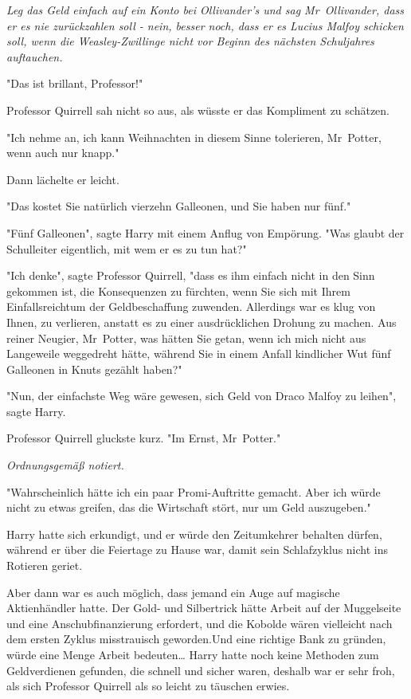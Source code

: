 {\emph{Leg das Geld einfach auf ein Konto bei Ollivander's und sag Mr~Ollivander, dass er es nie zurückzahlen soll - nein, besser noch, dass er es Lucius Malfoy schicken soll, wenn die Weasley-Zwillinge nicht vor Beginn des nächsten Schuljahres auftauchen.}

"Das ist brillant, Professor!"

Professor Quirrell sah nicht so aus, als wüsste er das Kompliment zu schätzen.

"Ich nehme an, ich kann Weihnachten in diesem Sinne tolerieren, Mr~Potter, wenn auch nur knapp."

Dann lächelte er leicht.

"Das kostet Sie natürlich vierzehn Galleonen, und Sie haben nur fünf."

"Fünf Galleonen", sagte Harry mit einem Anflug von Empörung. "Was glaubt der Schulleiter eigentlich, mit wem er es zu tun hat?"

"Ich denke", sagte Professor Quirrell, "dass es ihm einfach nicht in den Sinn gekommen ist, die Konsequenzen zu fürchten, wenn Sie sich mit Ihrem Einfallsreichtum der Geldbeschaffung zuwenden. Allerdings war es klug von Ihnen, zu verlieren, anstatt es zu einer ausdrücklichen Drohung zu machen. Aus reiner Neugier, Mr~Potter, was hätten Sie getan, wenn ich mich nicht aus Langeweile weggedreht hätte, während Sie in einem Anfall kindlicher Wut fünf Galleonen in Knuts gezählt haben?"

"Nun, der einfachste Weg wäre gewesen, sich Geld von Draco Malfoy zu leihen", sagte Harry.

Professor Quirrell gluckste kurz. "Im Ernst, Mr~Potter."

\emph{Ordnungsgemäß notiert.}

"Wahrscheinlich hätte ich ein paar Promi-Auftritte gemacht. Aber ich würde nicht zu etwas greifen, das die Wirtschaft stört, nur um Geld auszugeben."

Harry hatte sich erkundigt, und er würde den Zeitumkehrer behalten dürfen, während er über die Feiertage zu Hause war, damit sein Schlafzyklus nicht ins Rotieren geriet.

Aber dann war es auch möglich, dass jemand ein Auge auf magische Aktienhändler hatte. Der Gold- und Silbertrick hätte Arbeit auf der Muggelseite und eine Anschubfinanzierung erfordert, und die Kobolde wären vielleicht nach dem ersten Zyklus misstrauisch geworden.Und eine richtige Bank zu gründen, würde eine Menge Arbeit bedeuten… Harry hatte noch keine Methoden zum Geldverdienen gefunden, die schnell und sicher waren, deshalb war er sehr froh, als sich Professor Quirrell als so leicht zu täuschen erwies.

}
